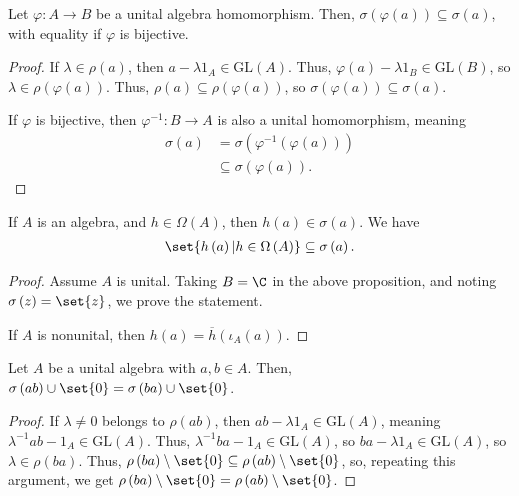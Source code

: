 \documentclass[10pt]{mypackage}
\newcommand{\GL}{\text{GL}}
\begin{document}
\begin{proposition}
  Let $\varphi\colon A\rightarrow B$ be a unital algebra homomorphism. Then, $\sigma\left(\varphi\left(a\right)\right)\subseteq \sigma\left(a\right)$, with equality if $\varphi$ is bijective.
\end{proposition}
\begin{proof}
  If $\lambda\in \rho\left(a\right)$, then $a - \lambda 1_A \in \GL\left(A\right)$. Thus, $\varphi\left(a\right) - \lambda 1_B\in \GL\left(B\right)$, so $\lambda\in \rho\left(\varphi\left(a\right)\right)$. Thus, $\rho\left(a\right) \subseteq \rho\left(\varphi\left(a\right)\right)$, so $\sigma\left(\varphi\left(a\right)\right)\subseteq \sigma\left(a\right)$.\newline

  If $\varphi$ is bijective, then $\varphi^{-1}\colon B\rightarrow A$ is also a unital homomorphism, meaning
  \begin{align*}
    \sigma\left(a\right) &= \sigma\left(\varphi^{-1}\left(\varphi\left(a\right)\right)\right)\\
                         &\subseteq \sigma\left(\varphi\left(a\right)\right).
  \end{align*}
\end{proof}
\begin{corollary}
  If $A$ is an algebra, and $h\in \Omega\left(A\right)$, then $h\left(a\right)\in \sigma\left(a\right)$. We have
  \begin{align*}
    \set{h\left(a\right) | h\in \Omega\left(A\right)}\subseteq \sigma\left(a\right).
  \end{align*}
\end{corollary}
\begin{proof}
  Assume $A$ is unital. Taking $B = \C$ in the above proposition, and noting $\sigma\left(z\right) = \set{z}$, we prove the statement.\newline

  If $A$ is nonunital, then $h(a) = \overline{h}\left(\iota_A\left(a\right)\right)$.
\end{proof}
\begin{fact}
  Let $A$ be a unital algebra with $a,b\in A$. Then, $\sigma\left(ab\right)\cup \set{0} = \sigma\left(ba\right)\cup \set{0}$.
\end{fact}
\begin{proof}
  If $\lambda\neq 0$ belongs to $\rho\left(ab\right)$, then $ab - \lambda 1_A \in \GL\left(A\right)$, meaning $\lambda^{-1}ab - 1_{A}\in \GL\left(A\right)$. Thus, $\lambda^{-1}ba - 1_A\in \GL\left(A\right)$, so $ba - \lambda 1_A\in \GL\left(A\right)$, so $\lambda \in \rho\left(ba\right)$. Thus, $\rho\left(ba\right)\setminus\set{0} \subseteq \rho\left(ab\right)\setminus \set{0}$, so, repeating this argument, we get $\rho\left(ba\right)\setminus \set{0} = \rho\left(ab\right)\setminus \set{0}$.
\end{proof}
\end{document}
